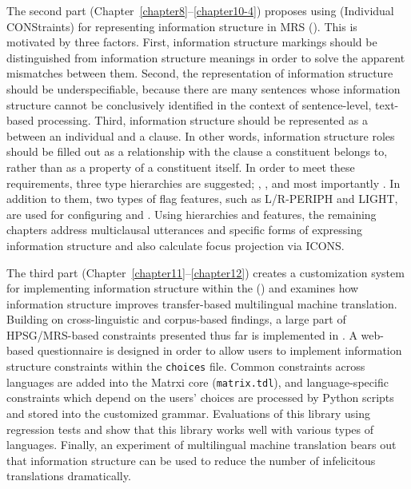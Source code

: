 The second part (Chapter~\ref{chapter8}--\ref{chapter10-4}) proposes
using  (Individual CONStraints)
for representing information structure in MRS
(\citealt{copestake:etal:05}). This is motivated by three
factors.  First, information structure markings should be
distinguished from information structure meanings in order to solve
the apparent mismatches between them. Second, the representation of
information structure should be
underspecifiable, because there are
many sentences whose information structure cannot be conclusively
identified in the context of sentence-level, text-based
processing. Third, information structure should be represented as a
 between an individual and a clause. In other
words, information structure roles should be filled out as a
relationship with the clause a constituent belongs to, rather than as
a property of a constituent itself. In order to meet these
requirements, three type hierarchies are suggested; ,
, and most importantly
.
In addition to them, two types of flag features, such as L/R-PERIPH
and LIGHT, are used for configuring  and
. Using hierarchies and features,
the remaining chapters address multiclausal utterances and specific
forms of expressing information structure and also calculate focus
projection via ICONS.


The third part (Chapter~\ref{chapter11}--\ref{chapter12}) creates a
customization system for implementing information structure within the
\lingo {} (\citealt{bender:etal:10}) and examines
how information structure improves transfer-based multilingual machine
translation. Building on cross-linguistic and
corpus-based findings, a large part of HPSG/MRS-based
constraints presented thus far is implemented in . A
web-based questionnaire is designed in order to allow users to
implement information structure constraints within the
\texttt{choices} file. Common constraints across languages are added
into the Matrxi core (\texttt{matrix.tdl}), and language-specific
constraints which depend on the users' choices are processed by Python
scripts and stored into the customized grammar. Evaluations of this
library using regression tests and 
\citep{bender:14} show that this library works well with various types
of languages. Finally, an experiment of
multilingual machine translation bears out that information structure
can be used to reduce the number of infelicitous translations
dramatically.





